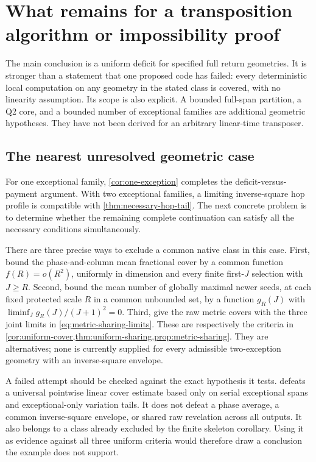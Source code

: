 \section{What remains for a transposition algorithm or impossibility proof}
\label{sec:roadmap}

The main conclusion is a uniform deficit for specified full return
geometries. It is stronger than a statement that one proposed code has
failed: every deterministic local computation on any geometry in the
stated class is covered, with no linearity assumption. Its scope is also
explicit. A bounded full-span partition, a Q2 core, and a bounded number
of exceptional families are additional geometric hypotheses. They have
not been derived for an arbitrary linear-time transposer.

\subsection{The nearest unresolved geometric case}

For one exceptional family, \cref{cor:one-exception} completes the
deficit-versus-payment argument. With two exceptional families, a
limiting inverse-square hop profile is compatible with
\cref{thm:necessary-hop-tail}. The next concrete problem is to determine
whether the remaining complete continuation can satisfy all the
necessary conditions simultaneously.

There are three precise ways to exclude a common native class in this
case. First, bound the phase-and-column mean fractional cover by a
common function $f(R)=o(R^2)$, uniformly in dimension and every finite
first-$J$ selection with $J\ge R$. Second, bound the mean number of
globally maximal newer seeds, at each fixed protected scale $R$ in a
common unbounded set, by a function $g_R(J)$ with
$\liminf_J g_R(J)/(J+1)^2=0$. Third, give the raw metric covers with
the three joint limits in \cref{eq:metric-sharing-limits}.
These are respectively the criteria in
\cref{cor:uniform-cover,thm:uniform-sharing,prop:metric-sharing}.
They are alternatives; none is currently supplied for every admissible
two-exception geometry with an inverse-square envelope.

A failed attempt should be checked against the exact hypothesis it
tests.  defeats a universal pointwise
linear cover estimate based only on serial exceptional spans and
exceptional-only variation tails. It does not defeat a phase average,
a common inverse-square envelope, or shared raw revelation across all
outputs. It also belongs to a class already excluded by the finite
skeleton corollary. Using it as evidence against all three uniform
criteria would therefore draw a conclusion the example does not support.

